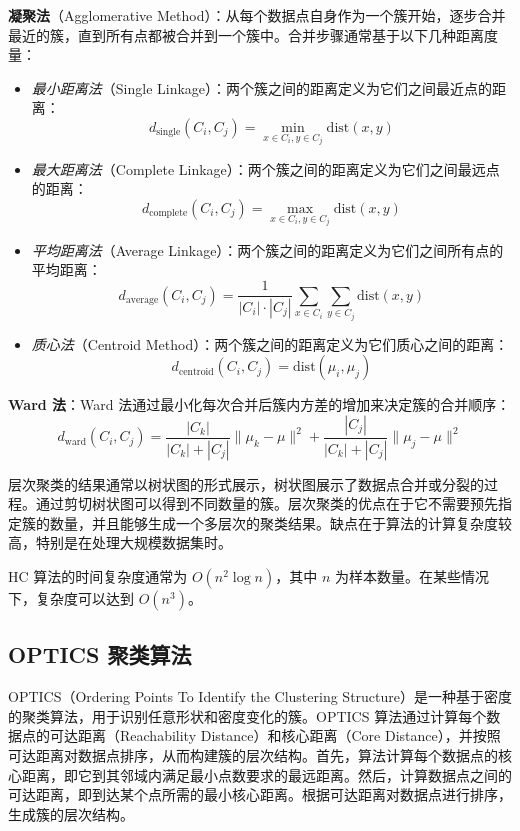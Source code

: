 \documentclass{ctexart} %
\begin{document}
\textbf{凝聚法}（Agglomerative Method）：从每个数据点自身作为一个簇开始，逐步合并最近的簇，直到所有点都被合并到一个簇中。合并步骤通常基于以下几种距离度量：

\begin{itemize}
    \item \textit{最小距离法}（Single Linkage）：两个簇之间的距离定义为它们之间最近点的距离：
    \[
    d_{\text{single}}(C_i, C_j) = \min_{x \in C_i, y \in C_j} \text{dist}(x, y)
    \]
    \item \textit{最大距离法}（Complete Linkage）：两个簇之间的距离定义为它们之间最远点的距离：
    \[
    d_{\text{complete}}(C_i, C_j) = \max_{x \in C_i, y \in C_j} \text{dist}(x, y)
    \]
    \item \textit{平均距离法}（Average Linkage）：两个簇之间的距离定义为它们之间所有点的平均距离：
    \[
    d_{\text{average}}(C_i, C_j) = \frac{1}{|C_i| \cdot |C_j|} \sum_{x \in C_i} \sum_{y \in C_j} \text{dist}(x, y)
    \]
    \item \textit{质心法}（Centroid Method）：两个簇之间的距离定义为它们质心之间的距离：
    \[
    d_{\text{centroid}}(C_i, C_j) = \text{dist}(\mu_i, \mu_j)
    \]
\end{itemize}

\textbf{Ward 法}：Ward 法通过最小化每次合并后簇内方差的增加来决定簇的合并顺序：
\[
d_{\text{ward}}(C_i, C_j) = \frac{|C_k|}{|C_k| + |C_j|} \|\mu_k - \mu\|^2 + \frac{|C_j|}{|C_k| + |C_j|} \|\mu_j - \mu\|^2
\]

层次聚类的结果通常以树状图的形式展示，树状图展示了数据点合并或分裂的过程。通过剪切树状图可以得到不同数量的簇。层次聚类的优点在于它不需要预先指定簇的数量，并且能够生成一个多层次的聚类结果。缺点在于算法的计算复杂度较高，特别是在处理大规模数据集时。

HC 算法的时间复杂度通常为 \(O(n^2 \log n)\)，其中 \(n\) 为样本数量。在某些情况下，复杂度可以达到 \(O(n^3)\)。

\subsection{OPTICS 聚类算法}

OPTICS（Ordering Points To Identify the Clustering Structure）是一种基于密度的聚类算法，用于识别任意形状和密度变化的簇。OPTICS 算法通过计算每个数据点的可达距离（Reachability Distance）和核心距离（Core Distance），并按照可达距离对数据点排序，从而构建簇的层次结构。首先，算法计算每个数据点的核心距离，即它到其邻域内满足最小点数要求的最远距离。然后，计算数据点之间的可达距离，即到达某个点所需的最小核心距离。根据可达距离对数据点进行排序，生成簇的层次结构。
\end{document}
